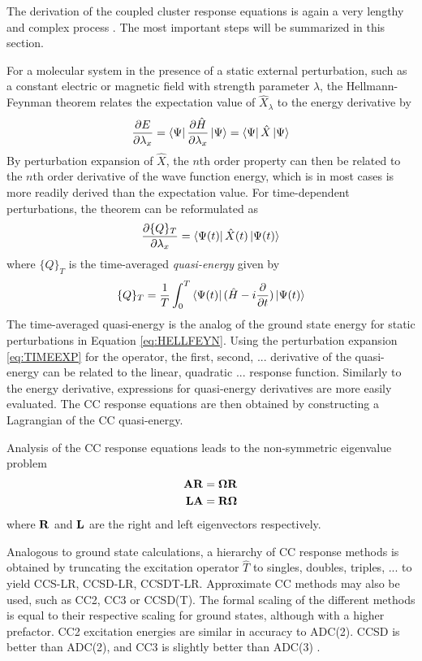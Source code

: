 The derivation of the coupled cluster response equations is again a very lengthy and complex process \cite{Koc1990,Chr1998}. The most important steps will be summarized in this section.

For a molecular system in the presence of a static external perturbation, such as a constant electric or magnetic field with strength parameter $\lambda$, the Hellmann-Feynman theorem relates the expectation value of $\hat{X}_{\lambda}$ to the energy derivative by
\begin{equation}
\frac{\partial E}{\partial \lambda_x} = \bra{\smash{\Psi}}\frac{\partial \hat{H}}{\partial \lambda_x} \ket{\smash{\Psi}} = \bra{\smash{\Psi}}\hat{X} \ket{\smash{\Psi}}
\label{eq:HELLFEYN}
\end{equation}
\noindent By perturbation expansion of $\hat{X}$, the $n$th order property can then be related to the $n$th order derivative of the wave function energy, which is in most cases is more readily derived than the expectation value. For time-dependent perturbations, the theorem can be reformulated as 
\begin{equation}
\frac{\partial \{Q\}_T}{\partial \lambda_x} = \bra{\smash{\Psi(t)}} \hat{X}(t) \ket{\smash{\Psi(t)}} 
\end{equation}
\noindent where $\{Q\}_T$ is the time-averaged \emph{quasi-energy} given by
\begin{equation}
\{Q\}_T = \frac{1}{T} \int_0^T \bra{\smash{\Psi(t)}} (\hat{H} - i\frac{\partial}{\partial t})\ket{\smash{\Psi(t)}}
\label{eq:HELLFEYN2}
\end{equation}
\noindent The time-averaged quasi-energy is the analog of the ground state energy for static perturbations in Equation \ref{eq:HELLFEYN}. Using the perturbation expansion \ref{eq:TIMEEXP} for the operator, the first, second, ... derivative of the quasi-energy can be related to the linear, quadratic ... response function. Similarly to the energy derivative, expressions for quasi-energy derivatives are more easily evaluated. The CC response equations are then obtained by constructing a Lagrangian of the CC quasi-energy. 

Analysis of the CC response equations leads to the non-symmetric eigenvalue problem
\begin{align}
\mathbf{A}\mathbf{R} &= \mathbf{\Omega}\mathbf{R} \\
\mathbf{L}\mathbf{A} &= \mathbf{R}\mathbf{\Omega} 
\end{align} 
\noindent where $\mathbf{R}$ and $\mathbf{L}$ are the right and left eigenvectors respectively.

Analogous to ground state calculations, a hierarchy of CC response methods is obtained by truncating the excitation operator $\hat{T}$ to singles, doubles, triples, ... to yield CCS-LR, CCSD-LR, CCSDT-LR. Approximate CC methods may also be used, such as CC2, CC3 or CCSD(T). The formal scaling of the different methods is equal to their respective scaling for ground states, although with a higher prefactor. CC2 excitation energies are similar in accuracy to ADC(2). CCSD is better than ADC(2), and CC3 is slightly better than ADC(3) \cite{Loo2020}. 

